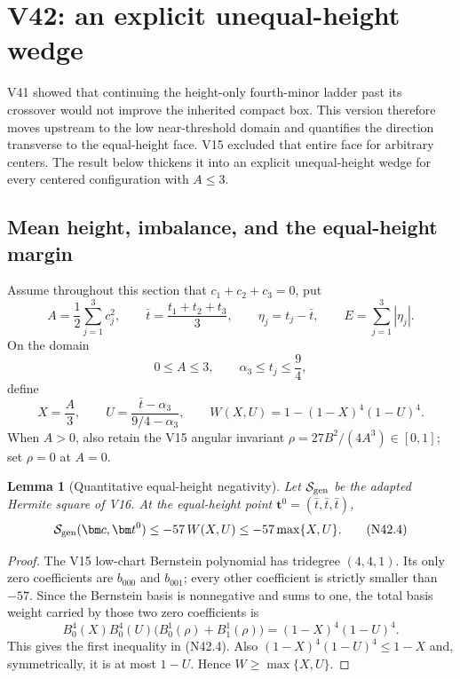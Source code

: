\documentclass[11pt]{article}
\newtheorem{lemma}[theorem]{Lemma}
\theoremstyle{definition}
\theoremstyle{remark}
\begin{document}
\section{V42: an explicit unequal-height wedge}
\label{sec:f2v42-wedge}

V41 showed that continuing the height-only fourth-minor ladder past its
crossover would not improve the inherited compact box.  This version
therefore moves upstream to the low near-threshold domain and quantifies
the direction transverse to the equal-height face.  V15 excluded that
entire face for arbitrary centers.  The result below thickens it into an
explicit unequal-height wedge for every centered configuration with
\(A\leq3\).

\subsection{Mean height, imbalance, and the equal-height margin}

Assume throughout this section that
\(c_1+c_2+c_3=0\), put
\[
 A=\frac12\sum_{j=1}^3c_j^2,\qquad
 \bar t=\frac{t_1+t_2+t_3}{3},\qquad
 \eta_j=t_j-\bar t,\qquad
 E=\sum_{j=1}^3|\eta_j|.
\tag{N42.1}
\]
On the domain
\[
 0\leq A\leq3,\qquad
 \alpha_3\leq t_j\leq\frac94,
\tag{N42.2}
\]
define
\[
 X=\frac A3,\qquad
 U=\frac{\bar t-\alpha_3}{9/4-\alpha_3},\qquad
 W(X,U)=1-(1-X)^4(1-U)^4.
\tag{N42.3}
\]
When \(A>0\), also retain the V15 angular invariant
\(\rho=27B^2/(4A^3)\in[0,1]\); set \(\rho=0\) at \(A=0\).

\begin{lemma}[Quantitative equal-height negativity]
\label{lem:f2v42-base-margin}
Let \(\mathcal S_{\rm gen}\) be the adapted Hermite square of V16.
At the equal-height point
\(\bm t^0=(\bar t,\bar t,\bar t)\),
\[
 \mathcal S_{\rm gen}(\bm c,\bm t^0)
 \leq-57\,W(X,U)
 \leq-57\max\{X,U\}.
\tag{N42.4}
\]
\end{lemma}

\begin{proof}
The V15 low-chart Bernstein polynomial has tridegree \((4,4,1)\).
Its only zero coefficients are \(b_{000}\) and \(b_{001}\); every other
coefficient is strictly smaller than \(-57\).  Since the Bernstein basis
is nonnegative and sums to one, the total basis weight carried by those
two zero coefficients is
\[
 B_0^4(X)B_0^4(U)\bigl(B_0^1(\rho)+B_1^1(\rho)\bigr)
 =(1-X)^4(1-U)^4.
\]
This gives the first inequality in \textup{(N42.4)}.  Also
\((1-X)^4(1-U)^4\leq1-X\) and, symmetrically, it is at most \(1-U\).
Hence \(W\geq\max\{X,U\}\).
\end{proof}
\end{document}
